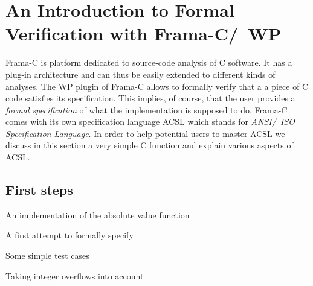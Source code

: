 
\section{An Introduction to Formal Verification with Frama-C\slash\ WP}
\label{sec:frama-c}

Frama-C is platform dedicated to source-code analysis of C software.
It has a plug-in architecture and can thus be easily extended to 
different kinds of analyses.
The WP plugin of Frama-C allows to formally verify that a a piece of
C code satisfies its specification.
This implies, of course, that the user provides a \emph{formal specification}
of what the implementation is supposed to do.
Frama-C comes with its own specification language ACSL which stands for
\emph{ANSI\slash\ ISO Specification Language}.
In order to help potential users to master ACSL we discuss in this section 
a very simple C function and explain various aspects of ACSL.

\subsection{First steps}

\begin{listing}[hbt]
\begin{minipage}{\textwidth}

\end{minipage}
\caption{\label{fig:abs} An implementation of the absolute value function}
\end{listing}

\begin{listing}[hbt]
\begin{minipage}{\textwidth}

\end{minipage}
\caption{\label{fig:abs1} A first attempt to formally specify }
\end{listing}

\begin{listing}[hbt]
\begin{minipage}{\textwidth}

\end{minipage}
\caption{\label{fig:test_abs} Some simple test cases}
\end{listing}

\begin{listing}[hbt]
\begin{minipage}{\textwidth}

\end{minipage}
\caption{\label{fig:abs1a} Taking integer overflows into account}
\end{listing}

